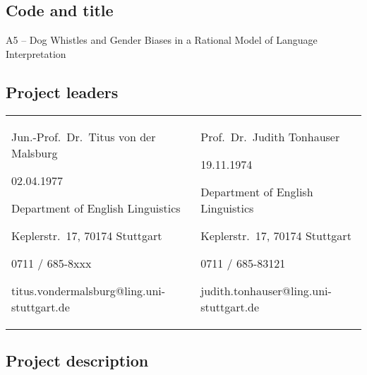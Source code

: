 \documentclass[11pt]{article}
\begin{document}


\subsection{Code and title}

A5 -- Dog Whistles and Gender Biases in a Rational Model of Language Interpretation

\subsection{Project leaders}

\begin{tabular}{p{}p{}}
  Jun.-Prof.\ Dr.\ Titus von der Malsburg \par
  02.04.1977 \par
  Department of English Linguistics \par
  Keplerstr.\ 17, 70174 Stuttgart \par
  0711 / 685-8xxx \par
  titus.vondermalsburg@ling.uni-stuttgart.de
  &
  Prof.\ Dr.\ Judith Tonhauser \par
  19.11.1974 \par
  Department of English Linguistics \par
  Keplerstr.\ 17, 70174 Stuttgart \par
  0711 / 685-83121 \par
  judith.tonhauser@ling.uni-stuttgart.de
\end{tabular}

\subsection{Project description}
\end{document}
